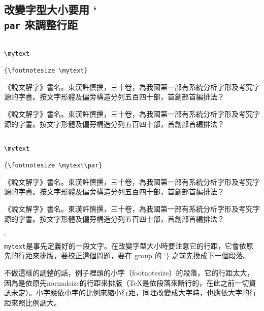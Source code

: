 \subsection{改變字型大小要用 \char`\\\texttt{par} 來調整行距}

\def\mytext{%
《說文解字》書名。東漢許慎撰，三十卷，為我國第一部有系統分析字形及考究字源的字書。按文字形體及偏旁構造分列五百四十部，首創部首編排法？}

\begin{Wrong}
\begin{verbatim}

\mytext

{\footnotesize \mytext}

\end{verbatim}
\mytext

{\footnotesize \mytext}
\end{Wrong}

\begin{Right}
\begin{verbatim}

\mytext

{\footnotesize \mytext\par}

\end{verbatim}
\mytext

{\footnotesize \mytext\par}
\end{Right}
\char`\\\texttt{mytext}是事先定義好的一段文字。在改變字型大小時要注意它的行距，它會依原先的行距來排版，要校正這個問題，要在 group 的 \char`\} 之前先換成下一個段落。

不做這樣的調整的話，例子裡頭的小字（footnotesize）的段落，它的行距太大，因為是依原先normalsize的行距來排版（\TeX 是依段落來斷行的，在此之前一切資訊未定）。小字應依小字的比例來縮小行距，同理改變成大字時，也應依大字的行距來照比例調大。

\back
